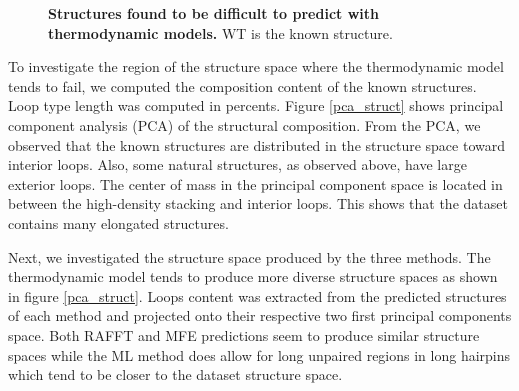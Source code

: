 \documentclass[a4paper,12pt]{article}
\begin{document}
{{\begin{figure}[!ht]
  \caption{\textbf{Structures found to be difficult to predict with thermodynamic models.}  WT is the known structure.\label{diff_struct}}
\end{figure}

To investigate the region of the structure space where the thermodynamic model
tends to fail, we computed the composition content of the known structures. Loop
type length was computed in percents. Figure \ref{pca_struct} shows principal
component analysis (PCA) of the structural composition. From the PCA, we
observed that the known structures are distributed in the structure space toward
interior loops. Also, some natural structures, as observed above, have large
exterior loops. The center of mass in the principal component space is located
in between the high-density stacking and interior loops. This shows that the
dataset contains many elongated structures.

Next, we investigated the structure space produced by the three methods. The
thermodynamic model tends to produce more diverse structure spaces as shown in
figure \ref{pca_struct}. Loops content was extracted from the predicted structures
of each method and projected onto their respective two first principal
components space. Both RAFFT and MFE predictions seem to produce similar
structure spaces while the ML method does allow for long unpaired regions in
long hairpins which tend to be closer to the dataset structure space.

}}
\end{document}
